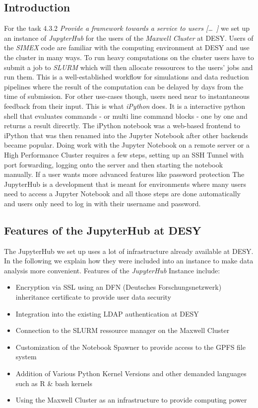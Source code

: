 \documentclass[10pt]{scrartcl}
\begin{document}
\subsection{Introduction}
For the task 4.3.2 \textit{Provide a framework towards a service to users [\dots\ ] } we set up an instance of \textit{JupyterHub} for the users of the \textit{Maxwell Cluster} at \textsc{DESY}.
Users of the \textit{SIMEX} code are familiar with the computing environment at \textsc{DESY} and use the cluster in many ways.
To run heavy computations on the cluster users have to submit a job to \textit{SLURM} which will then allocate ressources to the users' jobs and run them.
This is a well-established workflow for simulations and data reduction pipelines where the result of the
computation can be delayed by days from the time of submission.
For other use-cases though, users need near to instantaneous feedback from their input.
This is what \textit{iPython} does. It is a interactive python shell that evaluates commands - or multi line command blocks - one by one and returns a result direcrtly.
The iPython notebook was a web-based frontend to iPython that was then renamed into the Jupyter Notebook after other backends became popular.
Doing work with the Jupyter Notebook on a remote server or a High Performance Cluster requires a few steps, setting up an SSH Tunnel with port forwarding, logging onto the server and then starting the notebook manually.
If a user wants more advanced features like password protection
The JupyterHub is a development that is meant for environments where many users need to access a Jupyter Notebook and all those steps are done automatically and users only need to log in with their username and password.

\subsection{Features of the JupyterHub at DESY}
The JupyterHub we set up uses a lot of infrastructure already available at DESY. In the following we explain how they were included into an instance to make data analysis more convenient.
Features of the \textit{JupyterHub} Instance include:

\begin{itemize}
 \item Encryption via SSL using an DFN (Deutsches Forschungsnetzwerk) inheritance certificate to provide user data security
 \item Integration into the existing LDAP authentication at DESY
 \item Connection to the SLURM ressource manager on the Maxwell Cluster
 \item Customization of the Notebook Spawner to provide access to the GPFS file system
 \item Addition of Various Python Kernel Versions and other demanded languages such as R \& bash kernels
 \item Using the Maxwell Cluster as an infrastructure to provide computing power
\end{itemize}
%
\end{document}
